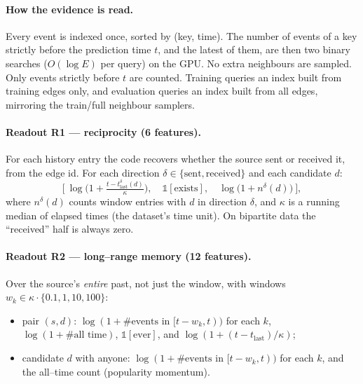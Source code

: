 \documentclass[11pt]{article}
\begin{document}
\paragraph{How the evidence is read.}
Every event is indexed once, sorted by (key, time). The number of events of a
key strictly before the prediction time $t$, and the latest of them, are then
two binary searches ($O(\log E)$ per query) on the GPU. No extra neighbours are
sampled. Only events strictly before $t$ are counted. Training queries an index
built from training edges only, and evaluation queries an index built from all
edges, mirroring the train/full neighbour samplers.

\paragraph{Readout R1 --- reciprocity (6 features).}
For each history entry the code recovers whether the source sent or received
it, from the edge id. For each direction $\delta\in\{\text{sent},\text{received}\}$
and each candidate $d$:
\[
  \Big[\ \log\!\big(1+\tfrac{t-t^{\delta}_{\text{last}}(d)}{\kappa}\big),\quad
  \mathbb{1}[\text{exists}],\quad
  \log\!\big(1+n^{\delta}(d)\big)\ \Big],
\]
where $n^{\delta}(d)$ counts window entries with $d$ in direction $\delta$, and
$\kappa$ is a running median of elapsed times (the dataset's time unit).
On bipartite data the ``received'' half is always zero.

\paragraph{Readout R2 --- long--range memory (12 features).}
Over the source's \emph{entire} past, not just the window, with windows
$w_k\in\kappa\cdot\{0.1,1,10,100\}$:
\begin{itemize}[nosep]
  \item pair $(s,d)$: $\log(1+\#\text{events in }[t-w_k,t))$ for each $k$,
        $\log(1+\#\text{all time})$, $\mathbb{1}[\text{ever}]$, and
        $\log(1+(t-t_{\text{last}})/\kappa)$;
  \item candidate $d$ with anyone: $\log(1+\#\text{events in }[t-w_k,t))$ for each
        $k$, and the all--time count (popularity momentum).
\end{itemize}
\end{document}

